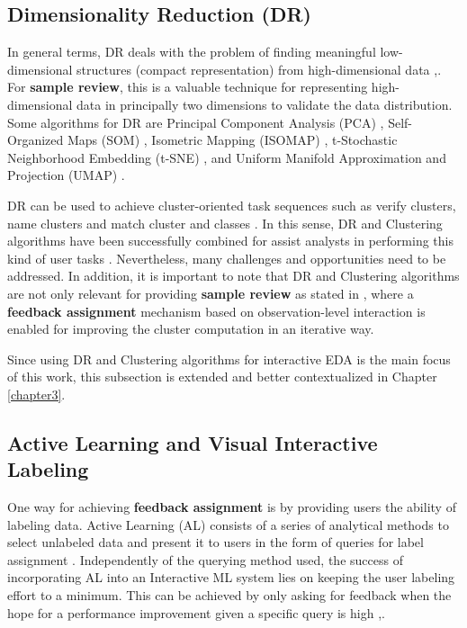 \subsection{Dimensionality Reduction (DR)}
\label{subsection2.1.1}

In general terms, DR deals with the problem of finding meaningful low-dimensional structures (compact representation) from high-dimensional data \cite{Tenenbaum2000},\cite{Roweis2000}. For \textbf{sample review}, this is a valuable technique for representing high-dimensional data in principally two dimensions to validate the data distribution. Some algorithms for DR are Principal Component Analysis (PCA) \cite{PCA}, Self-Organized Maps (SOM) \cite{Kohonen1982Self-organizedMaps}, Isometric Mapping (ISOMAP) \cite{Tenenbaum2000}, t-Stochastic Neighborhood Embedding (t-SNE) \cite{VanDerMaaten2008}, and Uniform Manifold Approximation and Projection (UMAP) \cite{McInnes2018}.

DR can be used to achieve cluster-oriented task sequences such as verify clusters, name clusters and match cluster and classes \cite{Brehmer2014VisualizingSequences}. In this sense, DR and Clustering algorithms have been successfully combined for assist analysts in performing this kind of user tasks \cite{Wenskovitch2018}. Nevertheless, many challenges and opportunities need to be addressed. In addition, it is important to note that DR and Clustering algorithms are not only relevant for providing \textbf{sample review} as stated in \cite{Wenskovitch2017}, where a \textbf{feedback assignment} mechanism based on observation-level interaction is enabled for improving the cluster computation in an iterative way. 

Since using DR and Clustering algorithms for interactive EDA is the main focus of this work, this subsection is extended and better contextualized in Chapter \ref{chapter3}. 

\subsection{Active Learning and Visual Interactive Labeling}
\label{subsection2.1.2}

One way for achieving \textbf{feedback assignment} is by providing users the ability of labeling data. Active Learning (AL) consists of a series of analytical methods to select unlabeled data and present it to users in the form of queries for label assignment \cite{Holzinger2016}. Independently of the querying method used, the success of incorporating AL into an Interactive ML system lies on keeping the user labeling effort to a minimum. This can be achieved by only asking for feedback when the hope for a performance improvement given a specific query is high \cite{Olsson2009},\cite{Tong2001}.

